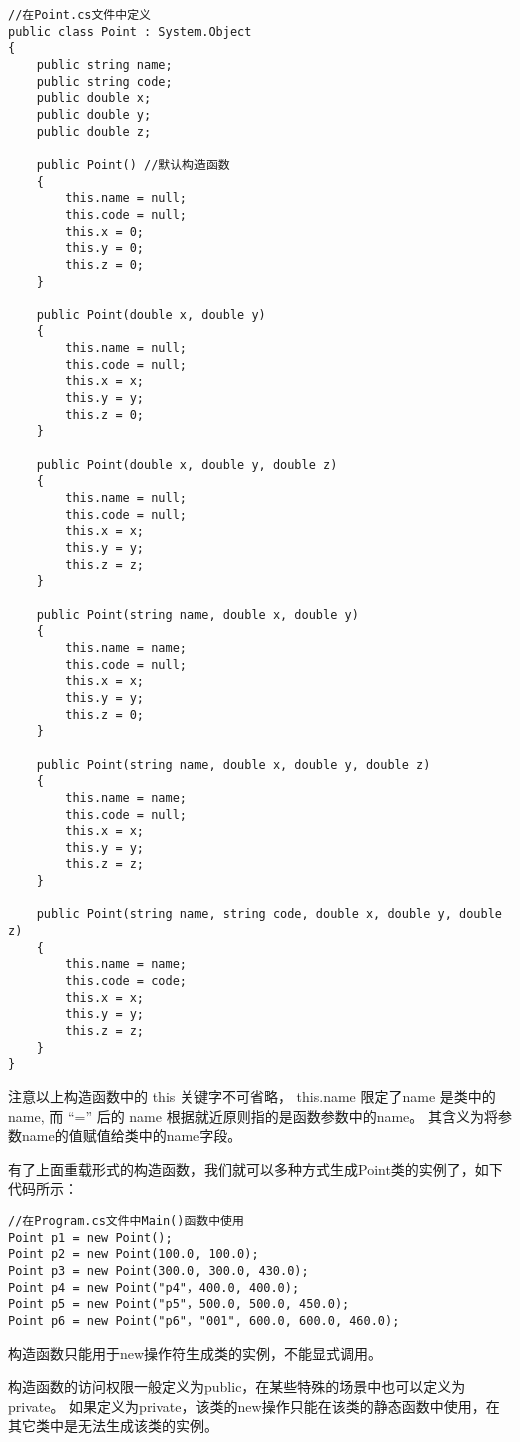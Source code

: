 \begin{lstlisting}
//在Point.cs文件中定义
public class Point : System.Object
{
    public string name;
    public string code;
    public double x;
    public double y;
    public double z;

    public Point() //默认构造函数
    {
        this.name = null;
        this.code = null;
        this.x = 0;
        this.y = 0;
        this.z = 0;
    }

    public Point(double x, double y)
    {
        this.name = null;
        this.code = null;
        this.x = x;
        this.y = y;
        this.z = 0;
    }

    public Point(double x, double y, double z)
    {
        this.name = null;
        this.code = null;
        this.x = x;
        this.y = y;
        this.z = z;
    }

    public Point(string name, double x, double y)
    {
        this.name = name;
        this.code = null;
        this.x = x;
        this.y = y;
        this.z = 0;
    }

    public Point(string name, double x, double y, double z)
    {
        this.name = name;
        this.code = null;
        this.x = x;
        this.y = y;
        this.z = z;
    }

    public Point(string name, string code, double x, double y, double z)
    {
        this.name = name;
        this.code = code;
        this.x = x;
        this.y = y;
        this.z = z;
    }
}
\end{lstlisting}

注意以上构造函数中的 this 关键字不可省略， this.name 限定了name 是类中的name,
而 ``='' 后的 name 根据就近原则指的是函数参数中的name。
其含义为将参数name的值赋值给类中的name字段。

有了上面重载形式的构造函数，我们就可以多种方式生成Point类的实例了，如下代码所示：

\begin{lstlisting}
//在Program.cs文件中Main()函数中使用
Point p1 = new Point();
Point p2 = new Point(100.0, 100.0);
Point p3 = new Point(300.0, 300.0, 430.0);
Point p4 = new Point("p4"，400.0, 400.0);
Point p5 = new Point("p5"，500.0, 500.0, 450.0);
Point p6 = new Point("p6"，"001", 600.0, 600.0, 460.0);
\end{lstlisting}

构造函数只能用于new操作符生成类的实例，不能显式调用。

构造函数的访问权限一般定义为public，在某些特殊的场景中也可以定义为private。
如果定义为private，该类的new操作只能在该类的静态函数中使用，在其它类中是无法生成该类的实例。

